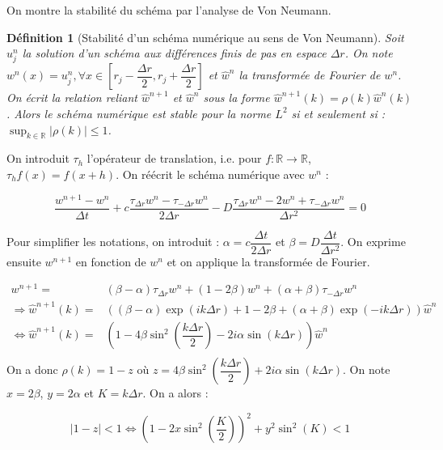 \documentclass[a4paper,fleqn,leqno]{article}
\newtheorem*{definition}{Définition}
\begin{document}
On montre la stabilité du schéma par l'analyse de Von Neumann\cite{VonNeumann}.

\begin{definition}[Stabilité d'un schéma numérique au sens de Von Neumann]
Soit $u^n_j$ la solution d'un schéma aux différences finis de pas en espace $\Delta r$. On note $w^n(x) = u^n_j, \forall x \in[r_j-\dfrac{\Delta r}{2},r_j+\dfrac{\Delta r}{2}]$ et $\hat{w}^n$ la transformée de Fourier de $w^n$. On écrit la relation reliant $\hat{w}^{n+1}$ et $\hat{w}^n$ sous la forme $\hat{w}^{n+1}(k)=\rho(k)\hat{w}^n(k)$. Alors le schéma numérique est stable pour la norme $L^2$ si et seulement si : $\sup_{k\in\mathbb{R}} \lvert \rho(k) \rvert \leq 1$.
\end{definition}


On introduit $\tau_h$ l'opérateur de translation, i.e. pour $f:\mathbb{R}\rightarrow\mathbb{R}$, $\tau_h f(x) = f(x+h)$. On réécrit le schéma numérique avec $w^n$ :

$$\dfrac{w^{n+1} - w^n}{\Delta t}+c\dfrac{\tau_{\Delta r}w^n-\tau_{-\Delta r}w^n}{2\Delta r}-D\dfrac{\tau_{\Delta r}w^n-2w^n+\tau_{-\Delta r}w^n}{\Delta r^2} = 0$$

Pour simplifier les notations, on introduit : $\alpha = c\dfrac{\Delta t}{2\Delta r}$ et $\beta = D\dfrac{\Delta t}{\Delta r^2}$. On exprime ensuite $w^{n+1}$ en fonction de $w^n$ et on applique la transformée de Fourier.

\begin{equation*}
\begin{array}{rl}
w^{n+1} = & (\beta-\alpha)\tau_{\Delta r}w^n+(1-2\beta)w^n+(\alpha+\beta)\tau_{-\Delta r}w^n \\
\Rightarrow \hat{w}^{n+1}(k) = & ((\beta-\alpha)\exp(ik\Delta r)+1-2\beta+(\alpha+\beta)\exp(-ik\Delta r))\hat{w}^n\\
\Leftrightarrow \hat{w}^{n+1}(k) = & (1 - 4\beta\sin^2(\dfrac{k\Delta r}{2}) - 2i\alpha\sin(k\Delta r))\hat{w}^n\\
\end{array}
\end{equation*}
On a donc $\rho(k) = 1-z$ où $z = 4\beta\sin^2(\dfrac{k\Delta r}{2}) + 2i\alpha\sin(k\Delta r)$. On note $x = 2\beta$, $y = 2\alpha$ et $K = k\Delta r$. On a alors :

\begin{equation}\label{eq:VN}
\lvert 1-z\rvert <1\Leftrightarrow (1 -2x\sin^2(\dfrac{K}{2}))^2 + y^2 \sin^2(K) < 1
\end{equation}
\end{document}
